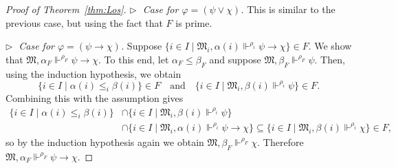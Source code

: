 \documentclass[submission,copyright,creativecommons]{eptcs}
\newcommand{\mo}{\mathfrak}
\renewcommand{\phi}{\varphi}
\newcommand{\satisfySym}{\Vdash}
\newcommand{\satisfy}[4]{#1, #2 \satisfySym^{#4} #3}
\begin{document}
\begin{proof}[Proof of Theorem~\ref{thm:Los}]
  \medskip\noindent
  \textit{$\triangleright\;$ Case for $\phi = (\psi \vee \chi)$.}
    This is similar to the previous case, but using the fact that $F$ is prime.

  \medskip\noindent
  \textit{$\triangleright\;$ Case for $\phi = (\psi \to \chi)$.}
    Suppose $\{ i \in I \mid \satisfy{\mo{M}_i}{\alpha(i)}{\psi \to \chi}{\rho_i} \} \in F$.
    We show that $\satisfy{\mo{M}}{\alpha_F}{\psi \to \chi}{\rho_F}$.
    To this end, let $\alpha_F \leq \beta_F$ and suppose
    $\satisfy{\mo{M}}{\beta_F}{\psi}{\rho_F}$.
    Then, using the induction hypothesis, we obtain
    \begin{equation*}
      \{ i \in I \mid \alpha(i) \leq_i \beta(i) \} \in F
      \quad\text{and}\quad
      \{ i \in I \mid \satisfy{\mo{M}_i}{\beta(i)}{\psi}{\rho_i} \} \in F.
    \end{equation*}
    Combining this with the assumption gives
    \begin{align*}
      \{ i \in I \mid \alpha(i) \leq_i \beta(i) \}
      &\cap \{ i \in I \mid \satisfy{\mo{M}_i}{\beta(i)}{\psi}{\rho_i} \} \\
      &\cap \{ i \in I \mid \satisfy{\mo{M}_i}{\alpha(i)}{\psi \to \chi}{\rho_i} \}
      \subseteq \{ i \in I \mid \satisfy{\mo{M}_i}{\beta(i)}{\chi}{\rho_i} \} \in F,
    \end{align*}
    so by the induction hypothesis again we obtain
    $\satisfy{\mo{M}}{\beta_F}{\chi}{\rho_F}$.
    Therefore $\satisfy{\mo{M}}{\alpha_F}{\psi \to \chi}{\rho_F}$.


\end{proof}
\end{document}
